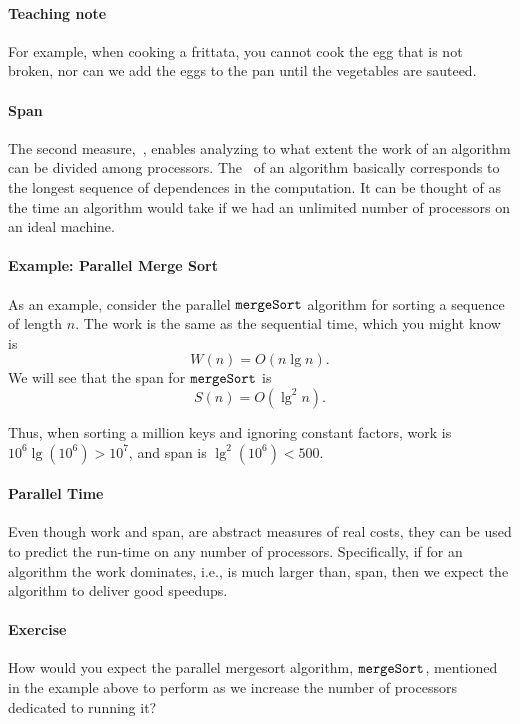 \paragraph{Teaching note}
For example, when cooking a frittata, you cannot cook the egg that is
not broken, nor can we add the eggs to the pan until the vegetables
are sauteed.

\paragraph{Span}
The second measure,~, enables analyzing to what extent the
work of an algorithm can be divided among processors.  The~
of an algorithm basically corresponds to the longest sequence of
dependences in the computation.  It can be thought of as the time an
algorithm would take if we had an unlimited number of processors on an
ideal machine.

\paragraph{Example: Parallel Merge Sort}
As an example, consider the parallel $\texttt{mergeSort}$ algorithm for
sorting a sequence of length $n$.  The work is the same as the
sequential time, which you might know is
\[
W(n) = O(n \lg{n}).
\] 
%
We will see that the span for
$\texttt{mergeSort}$ is
\[
S(n) = O(\lg^2{n}).
\]

Thus, when  sorting a million keys and ignoring constant factors, 
work is $10^6\lg (10^6) > 10^7$, and 
%
span is 
$\lg^2(10^6) < 500.$
%

\paragraph{Parallel Time}
Even though work and span, are abstract measures of real costs, they
can be used to predict the run-time on any number of processors.
%
Specifically, if for an algorithm the work dominates, i.e., is much
larger than, span, then we expect the algorithm to deliver good
speedups.


\paragraph{Exercise}
How would you expect the parallel mergesort algorithm, $\texttt{mergeSort}$,
mentioned in the example above to perform as we increase the number of
processors dedicated to running it?

